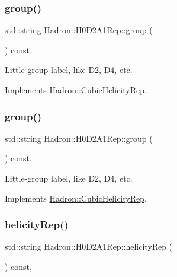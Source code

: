 \subsubsection{\texorpdfstring{group()}{group()}\hspace{0.1cm}{\footnotesize\ttfamily [2/3]}}
{\footnotesize\ttfamily std\+::string Hadron\+::\+H0\+D2\+A1\+Rep\+::group (\begin{DoxyParamCaption}{ }\end{DoxyParamCaption}) const\hspace{0.3cm}{\ttfamily [inline]}, {\ttfamily [virtual]}}

Little-\/group label, like D2, D4, etc. 

Implements \mbox{\hyperlink{structHadron_1_1CubicHelicityRep_a101a7d76cd8ccdad0f272db44b766113}{Hadron\+::\+Cubic\+Helicity\+Rep}}.

\mbox{\label{structHadron_1_1H0D2A1Rep_a2a8749e8be7f24396cd3156be2e1b037}} 
\subsubsection{\texorpdfstring{group()}{group()}\hspace{0.1cm}{\footnotesize\ttfamily [3/3]}}
{\footnotesize\ttfamily std\+::string Hadron\+::\+H0\+D2\+A1\+Rep\+::group (\begin{DoxyParamCaption}{ }\end{DoxyParamCaption}) const\hspace{0.3cm}{\ttfamily [inline]}, {\ttfamily [virtual]}}

Little-\/group label, like D2, D4, etc. 

Implements \mbox{\hyperlink{structHadron_1_1CubicHelicityRep_a101a7d76cd8ccdad0f272db44b766113}{Hadron\+::\+Cubic\+Helicity\+Rep}}.

\mbox{\label{structHadron_1_1H0D2A1Rep_ae0a667c77e5bdd60a1225ac10f4e1247}} 
\subsubsection{\texorpdfstring{helicityRep()}{helicityRep()}\hspace{0.1cm}{\footnotesize\ttfamily [1/2]}}
{\footnotesize\ttfamily std\+::string Hadron\+::\+H0\+D2\+A1\+Rep\+::helicity\+Rep (\begin{DoxyParamCaption}{ }\end{DoxyParamCaption}) const\hspace{0.3cm}{\ttfamily [inline]}, {\ttfamily [virtual]}}

